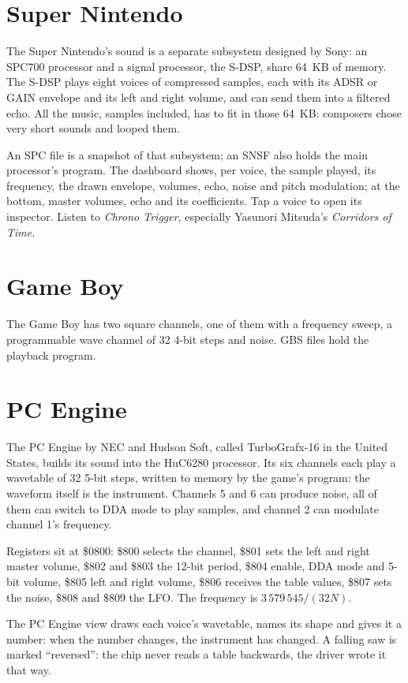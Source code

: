 \section{Super Nintendo}
The Super Nintendo's sound is a separate subsystem designed by Sony: an SPC700 processor and a signal processor, the
S-DSP, share 64~KB of memory. The S-DSP plays eight voices of compressed samples, each with its ADSR or GAIN
envelope and its left and right volume, and can send them into a filtered echo. All the music, samples included, has
to fit in those 64~KB: composers chose very short sounds and looped them.

An SPC file is a snapshot of that subsystem; an SNSF also holds the main processor's program. The dashboard shows,
per voice, the sample played, its frequency, the drawn envelope, volumes, echo, noise and pitch modulation; at the
bottom, master volumes, echo and its coefficients. Tap a voice to open its inspector. Listen to \emph{Chrono
Trigger}, especially Yasunori Mitsuda's \emph{Corridors of Time}.

\section{Game Boy}
The Game Boy has two square channels, one of them with a frequency sweep, a programmable wave channel of 32 4-bit
steps and noise. GBS files hold the playback program.

\section{PC Engine}
The PC Engine by NEC and Hudson Soft, called TurboGrafx-16 in the United States, builds its sound into the HuC6280
processor. Its six channels each play a wavetable of 32 5-bit steps, written to memory by the game's program: the
waveform itself is the instrument. Channels 5 and 6 can produce noise, all of them can switch to DDA mode to play
samples, and channel 2 can modulate channel 1's frequency.

Registers sit at \$0800: \$800 selects the channel, \$801 sets the left and right master volume, \$802 and \$803 the
12-bit period, \$804 enable, DDA mode and 5-bit volume, \$805 left and right volume, \$806 receives the table values,
\$807 sets the noise, \$808 and \$809 the LFO. The frequency is $3\,579\,545 / (32N)$.

The \soft PC Engine view draws each voice's wavetable, names its shape and gives it a number: when the number
changes, the instrument has changed. A falling saw is marked ``reversed'': the chip never reads a table backwards, the
driver wrote it that way.

